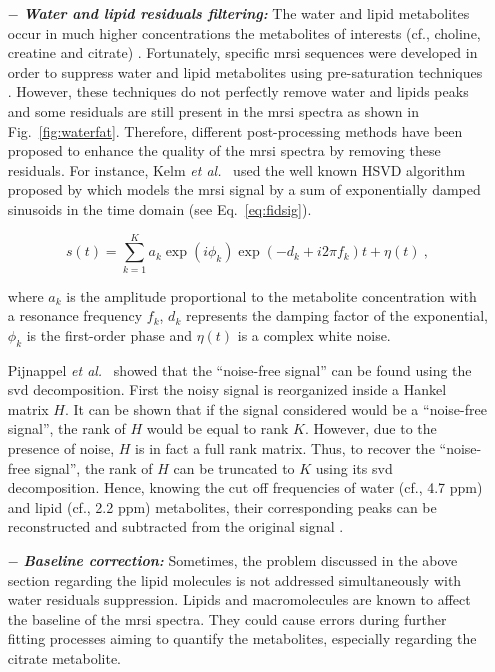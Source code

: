 \begin{enumerate}[leftmargin=*]
	\item[$-$] \textbf{\textit{Water and lipid residuals filtering:}} The water and lipid metabolites occur in much higher concentrations the metabolites of interests (cf., choline, creatine and citrate) \cite{Zhu2010,Osorio-Garcia2012}.
Fortunately, specific \ac{mrsi} sequences were developed in order to suppress water and lipid metabolites using pre-saturation techniques \cite{Zhu2010}.
However, these techniques do not perfectly remove water and lipids peaks and some residuals are still present in the \ac{mrsi} spectra as shown in Fig.~\ref{fig:waterfat}.
Therefore, different post-processing methods have been proposed to enhance the quality of the \ac{mrsi} spectra by removing these residuals.
For instance, Kelm \textit{et al.}~\cite{Kelm2007} used the well known HSVD algorithm proposed by \cite{Pijnappel1992} which models the \ac{mrsi} signal by a sum of exponentially damped sinusoids in the time domain (see Eq.~\eqref{eq:fidsig}).

\begin{equation}
	s(t) = \sum_{k=1}^{K} a_{k}\exp(i \phi_k) \exp( -d_{k} + i 2 \pi f_{k} ) t + \eta(t) \ ,
	\label{eq:fidsig}
\end{equation}

\noindent where $a_k$ is the amplitude proportional to the metabolite concentration with a resonance frequency $f_{k}$, $d_k$ represents the damping factor of the exponential, $\phi_k$ is the first-order phase and $\eta(t)$ is a complex white noise. 

Pijnappel \textit{et al.}~\cite{Pijnappel1992} showed that the ``noise-free signal'' can be found using the \ac{svd} decomposition.
First the noisy signal is reorganized inside a Hankel matrix $H$.
It can be shown that if the signal considered would be a ``noise-free signal'', the rank of $H$ would be equal to rank $K$.
However, due to the presence of noise, $H$ is in fact a full rank matrix.
Thus, to recover the ``noise-free signal'', the rank of $H$ can be truncated to $K$ using its \ac{svd} decomposition.
Hence, knowing the cut off frequencies of water (cf., 4.7 ppm) and lipid (cf., 2.2 ppm) metabolites, their corresponding peaks can be reconstructed and subtracted from the original signal \cite{Laudadio2002}.
	
	\item[$-$] \textbf{\textit{Baseline correction:}} Sometimes, the problem discussed in the above section regarding the lipid molecules is not addressed simultaneously with water residuals suppression.
Lipids and macromolecules are known to affect the baseline of the \ac{mrsi} spectra.
They could cause errors during further fitting processes aiming to quantify the metabolites, especially regarding the citrate metabolite.
	

\end{enumerate}
